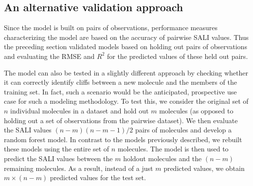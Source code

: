 \documentclass[letterpaper, 12pt]{article}
\begin{document}
\subsection{An alternative validation approach}
\label{sec:an-altern-valid}


Since the model is built on pairs of observations, performance measures characterizing the model are
based on the accuracy of pairwise SALI values. Thus the preceding section validated models based on
holding out pairs of observations and evaluating the RMSE and $R^2$ for the predicted values of
these held out pairs.

The model can also be tested in a slightly different approach by checking whether it can correctly
identify cliffs between a new molecule and the members of the training set. In fact, such a scenario
would be the anticipated, prospective use case for such a modeling methodology. To test this, we
consider the original set of $n$ individual molecules in a dataset and hold out $m$ molecules (as
opposed to holding out a set of observations from the pairwise dataset). We then evaluate the SALI
values $(n-m)(n-m-1)/2$ pairs of molecules and develop a random forest model. In contrast to the
models previously described, we rebuilt these models using the entire set of $n$ molecules. The
model is then used to predict the SALI values between the $m$ holdout molecules and the $(n-m)$
remaining molecules. As a result, instead of a just $m$ predicted values, we obtain $m \times (n-m)$
predicted values for the test set.
\end{document}
